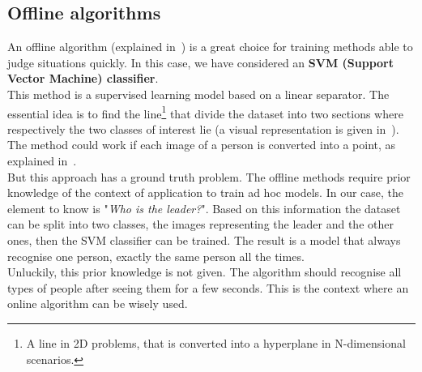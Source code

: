\subsection{Offline algorithms}
An offline algorithm (explained in~) is a great choice for training methods able to judge situations quickly. In this case, we have considered an \textbf{SVM (Support Vector Machine) classifier}.\\
This method is a supervised learning model based on a linear separator. The essential idea is to find the line\footnote{A line in 2D problems, that is converted into a hyperplane in N-dimensional scenarios.} that divide the dataset into two sections where respectively the two classes of interest lie (a visual representation is given in~). The method could work if each image of a person is converted into a point, as explained in~.\\
But this approach has a ground truth problem. The offline methods require prior knowledge of the context of application to train ad hoc models. In our case, the element to know is "\textit{Who is the leader?}". Based on this information the dataset can be split into two classes, the images representing the leader and the other ones, then the SVM classifier can be trained. The result is a model that always recognise one person, exactly the same person all the times.\\
Unluckily, this prior knowledge is not given. The algorithm should recognise all types of people after seeing them for a few seconds. This is the context where an online algorithm can be wisely used.

